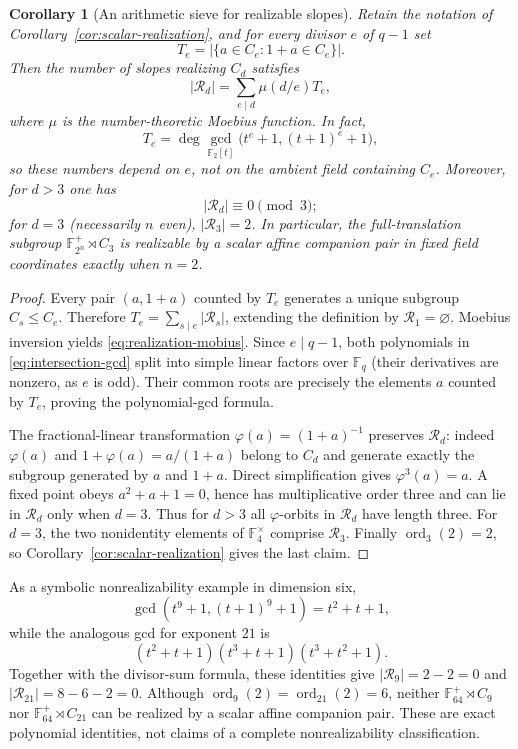 \documentclass[11pt]{article}
\newtheorem{corollary}[theorem]{Corollary}
\begin{document}
\begin{corollary}[An arithmetic sieve for realizable slopes]
\label{cor:scalar-sieve}
Retain the notation of Corollary~\ref{cor:scalar-realization},
and for every divisor $e$ of $q-1$ set
\[
T_e=|\{a\in C_e:1+a\in C_e\}|.
\]
Then the number of slopes realizing $C_d$ satisfies
\begin{equation}\label{eq:realization-mobius}
|\mathcal R_d|=\sum_{e\mid d}\mu(d/e)T_e,
\end{equation}
where $\mu$ is the number-theoretic Moebius function. In fact,
\begin{equation}\label{eq:intersection-gcd}
T_e=\deg\gcd_{\mathbb F_2[t]}\bigl(t^e+1,(t+1)^e+1\bigr),
\end{equation}
so these numbers depend on $e$, not on the ambient field containing $C_e$.
Moreover, for $d>3$ one has
\[
|\mathcal R_d|\equiv0\pmod3;
\]
for $d=3$ (necessarily $n$ even), $|\mathcal R_3|=2$.
In particular, the full-translation subgroup
$\mathbb F_{2^n}^+\rtimes C_3$ is realizable by a scalar affine
companion pair in fixed field coordinates exactly when $n=2$.
\end{corollary}
\begin{proof}
Every pair $(a,1+a)$ counted by $T_e$ generates a unique
subgroup $C_s\le C_e$. Therefore
$T_e=\sum_{s\mid e}|\mathcal R_s|$, extending the definition
by $\mathcal R_1=\varnothing$. Moebius inversion yields
\eqref{eq:realization-mobius}.
Since $e\mid q-1$, both polynomials in
\eqref{eq:intersection-gcd} split into simple linear factors over
$\mathbb F_q$ (their derivatives are nonzero, as $e$ is odd).
Their common roots are precisely the elements $a$ counted by $T_e$,
proving the polynomial-gcd formula.

The fractional-linear transformation
$\varphi(a)=(1+a)^{-1}$ preserves $\mathcal R_d$:
indeed $\varphi(a)$ and
$1+\varphi(a)=a/(1+a)$ belong to $C_d$ and generate
exactly the subgroup generated by $a$ and $1+a$.
Direct simplification gives $\varphi^3(a)=a$.
A fixed point obeys $a^2+a+1=0$, hence has multiplicative
order three and can lie in $\mathcal R_d$ only when $d=3$.
Thus for $d>3$ all $\varphi$-orbits in $\mathcal R_d$
have length three. For $d=3$, the two nonidentity elements
of $\mathbb F_4^\times$ comprise $\mathcal R_3$.
Finally $\operatorname{ord}_3(2)=2$,
so Corollary~\ref{cor:scalar-realization} gives the last claim.
\end{proof}

As a symbolic nonrealizability example in dimension six,
\[
\gcd(t^9+1,(t+1)^9+1)=t^2+t+1,
\]
while the analogous gcd for exponent $21$ is
\[
(t^2+t+1)(t^3+t+1)(t^3+t^2+1).
\]
Together with the divisor-sum formula, these identities give
$|\mathcal R_9|=2-2=0$ and
$|\mathcal R_{21}|=8-6-2=0$.
Although $\operatorname{ord}_9(2)=\operatorname{ord}_{21}(2)=6$,
neither $\mathbb F_{64}^+\rtimes C_9$ nor
$\mathbb F_{64}^+\rtimes C_{21}$ can be realized by a scalar affine
companion pair. These are exact polynomial identities, not claims
of a complete nonrealizability classification.
\end{document}
